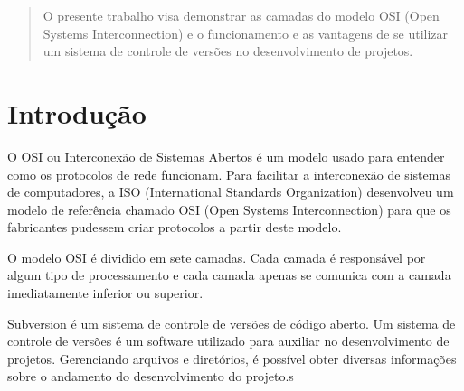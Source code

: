\begin{abstract}

O presente trabalho visa demonstrar as camadas do modelo OSI (Open Systems Interconnection) e o funcionamento e as vantagens de se utilizar um sistema de controle de versões no desenvolvimento de projetos.


\end{abstract}

\newpage

\section{Introdução}

O OSI  ou Interconexão de Sistemas Abertos é um modelo usado para entender como os protocolos de rede funcionam. Para facilitar a interconexão de sistemas de computadores, a ISO (International Standards Organization) desenvolveu um modelo de referência chamado OSI (Open Systems Interconnection) para que os fabricantes pudessem criar protocolos a partir deste modelo.

O modelo OSI é dividido em sete camadas. Cada camada é responsável por algum tipo de processamento e cada camada apenas se comunica com a camada imediatamente inferior ou superior.

Subversion é um sistema de controle de versões de código aberto. Um sistema de controle de versões é um software utilizado para auxiliar no desenvolvimento de projetos. Gerenciando arquivos e diretórios, é possível obter diversas informações sobre o andamento do desenvolvimento do projeto.s